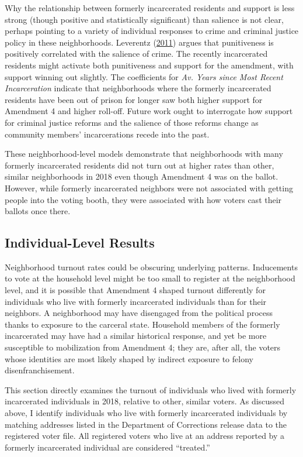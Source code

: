 \documentclass[
  12pt,
]{article}
\begin{document}
Why the relationship between formerly incarcerated residents and support is less strong (though positive and statistically significant) than salience is not clear, perhaps pointing to a variety of individual responses to crime and criminal justice policy in these neighborhoods. Leverentz (\protect\hyperlink{ref-Leverentz2011}{2011}) argues that punitiveness is positively correlated with the salience of crime. The recently incarcerated residents might activate both punitiveness and support for the amendment, with support winning out slightly. The coefficients for \emph{Av. Years since Most Recent Incarceration} indicate that neighborhoods where the formerly incarcerated residents have been out of prison for longer saw both higher support for Amendment 4 and higher roll-off. Future work ought to interrogate how support for criminal justice reforms and the salience of those reforms change as community members' incarcerations recede into the past.

These neighborhood-level models demonstrate that neighborhoods with many formerly incarcerated residents did not turn out at higher rates than other, similar neighborhoods in 2018 even though Amendment 4 was on the ballot. However, while formerly incarcerated neighbors were not associated with getting people into the voting booth, they were associated with how voters cast their ballots once there.

\hypertarget{individual-level-results}{%
\subsection*{Individual-Level Results}\label{individual-level-results}}

Neighborhood turnout rates could be obscuring underlying patterns. Inducements to vote at the household level might be too small to register at the neighborhood level, and it is possible that Amendment 4 shaped turnout differently for individuals who live with formerly incarcerated individuals than for their neighbors. A neighborhood may have disengaged from the political process thanks to exposure to the carceral state. Household members of the formerly incarcerated may have had a similar historical response, and yet be more susceptible to mobilization from Amendment 4; they are, after all, the voters whose identities are most likely shaped by indirect exposure to felony disenfranchisement.

This section directly examines the turnout of individuals who lived with formerly incarcerated individuals in 2018, relative to other, similar voters. As discussed above, I identify individuals who live with formerly incarcerated individuals by matching addresses listed in the Department of Corrections release data to the registered voter file. All registered voters who live at an address reported by a formerly incarcerated individual are considered ``treated.''
\end{document}
